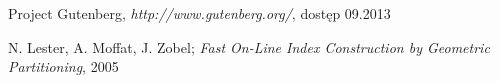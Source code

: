 \begin{thebibliography}{10}
 
  Project Gutenberg, \emph{http://www.gutenberg.org/}, dostęp 09.2013
 
  N. Lester, A. Moffat, J. Zobel; \emph{Fast On-Line Index Construction by Geometric Partitioning}, 2005
 
\end{thebibliography}
